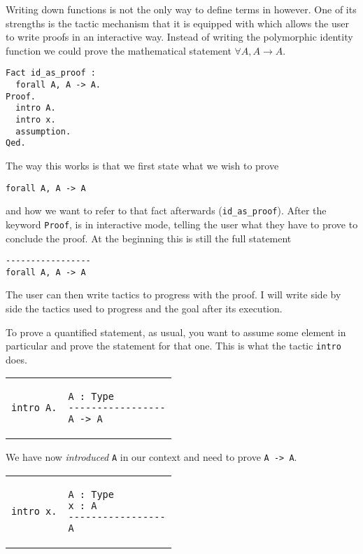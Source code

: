 Writing down functions is not the only way to define terms in \Coq however.
One of its strengths is the tactic mechanism that it is equipped with which
allows the user to write proofs in an interactive way.
Instead of writing the polymorphic identity function we could prove the
mathematical statement \(\forall A, A \to A\).
\begin{verbatim}
Fact id_as_proof :
  forall A, A -> A.
Proof.
  intro A.
  intro x.
  assumption.
Qed.
\end{verbatim}
The way this works is that we first state what we wish to prove
\begin{verbatim}
forall A, A -> A
\end{verbatim}
and how we want to refer to that fact afterwards
(\texttt{id_as_proof}).
After the keyword \texttt{Proof}, \Coq is in interactive mode,
telling the user what they have to prove to conclude the proof.
At the beginning this is still the full statement
\begin{verbatim}
-----------------
forall A, A -> A
\end{verbatim}
The user can then write tactics to progress with the proof.
I will write side by side the tactics used to progress and the goal after its
execution.

To prove a quantified statement, as usual, you want to assume some element in
particular and prove the statement for that one. This is what the tactic
\texttt{intro} does.

\begingroup
\centering
\begin{tabular}{p{}|p{}}
\begin{verbatim}
intro A.
\end{verbatim}
&
\begin{verbatim}
A : Type
-----------------
A -> A
\end{verbatim}
\end{tabular}
\endgroup

We have now \emph{introduced} \texttt{A} in our context and need to
prove \texttt{A -> A}.

\begingroup
\centering
\begin{tabular}{p{}|p{}}
\begin{verbatim}
intro x.
\end{verbatim}
&
\begin{verbatim}
A : Type
x : A
-----------------
A
\end{verbatim}
\end{tabular}
\endgroup

